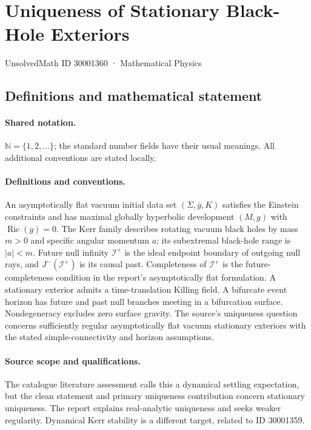 \documentclass[11pt]{article}
\begin{document}
\setcounter{section}{30001359}
\section{Uniqueness of Stationary Black-Hole Exteriors}\label{30001360}
{\small UnsolvedMath ID 30001360 · Mathematical Physics}
\subsection{Definitions and mathematical statement}

\paragraph{Shared notation.}$\mathbb N=\{1,2,\ldots\}$; the standard number fields have their usual meanings. All additional conventions are stated locally.


\paragraph{Definitions and conventions.} An asymptotically flat vacuum initial data set $(\Sigma,\bar g,K)$ satisfies the Einstein constraints and has maximal globally hyperbolic development $(M,g)$ with $\operatorname{Ric}(g)=0$. The Kerr family describes rotating vacuum black holes by mass $m>0$ and specific angular momentum $a$; its subextremal black-hole range is $|a|<m$. Future null infinity $\mathcal I^+$ is the ideal endpoint boundary of outgoing null rays, and $J^-(\mathcal I^+)$ is its causal past. Completeness of $\mathcal I^+$ is the future-completeness condition in the report's asymptotically flat formulation. A stationary exterior admits a time-translation Killing field. A bifurcate event horizon has future and past null branches meeting in a bifurcation surface. Nondegeneracy excludes zero surface gravity. The source's uniqueness question concerns sufficiently regular asymptotically flat vacuum stationary exteriors with the stated simple-connectivity and horizon assumptions.

\paragraph{Source scope and qualifications.} The catalogue literature assessment calls this a dynamical settling expectation, but the clean statement and primary uniqueness contribution concern stationary uniqueness. The report explains real-analytic uniqueness and seeks weaker regularity. Dynamical Kerr stability is a different target, related to ID 30001359.
\end{document}
